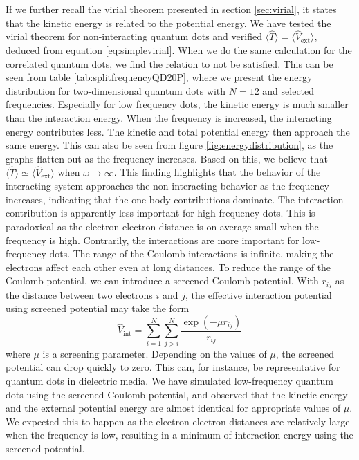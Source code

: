 If we further recall the virial theorem presented in section \ref{sec:virial}, it states that the kinetic energy is related to the potential energy. We have tested the virial theorem for non-interacting quantum dots and verified $\langle\hat{T}\rangle=\langle\hat{V}_{\text{ext}}\rangle$, deduced from equation \eqref{eq:simplevirial}. When we do the same calculation for the correlated quantum dots, we find the relation to not be satisfied. This can be seen from table \eqref{tab:splitfrequencyQD20P}, where we present the energy distribution for two-dimensional quantum dots with $N=12$ and selected frequencies. Especially for low frequency dots, the kinetic energy is much smaller than the interaction energy. When the frequency is increased, the interacting energy contributes less. The kinetic and total potential energy then approach the same energy. This can also be seen from figure \eqref{fig:energydistribution}, as the graphs flatten out as the frequency increases. Based on this, we believe that $\langle\hat{T}\rangle\simeq\langle\hat{V}_{\text{ext}}\rangle$ when $\omega\rightarrow\infty$. This finding highlights that the behavior of the interacting system approaches the non-interacting behavior as the frequency increases, indicating that the one-body contributions dominate. The interaction contribution is apparently less important for high-frequency dots. This is paradoxical as the electron-electron distance is on average small when the frequency is high. Contrarily, the interactions are more important for low-frequency dots. The range of the Coulomb interactions is infinite, making the electrons affect each other even at long distances. To reduce the range of the Coulomb potential, we can introduce a screened Coulomb potential. With $r_{ij}$ as the distance between two electrons $i$ and $j$, the effective interaction potential using screened potential may take the form
\begin{equation}
\hat{V}_{\text{int}}=\sum_{i=1}^N\sum_{j>i}^N\frac{\exp(-\mu r_{ij})}{r_{ij}}
\end{equation}
where $\mu$ is a screening parameter. Depending on the values of $\mu$, the screened potential can drop quickly to zero. This can, for instance, be representative for quantum dots in dielectric media. We have simulated low-frequency quantum dots using the screened Coulomb potential, and observed that the kinetic energy and the external potential energy are almost identical for appropriate values of $\mu$. We expected this to happen as the electron-electron distances are relatively large when the frequency is low, resulting in a minimum of interaction energy using the screened potential. 

